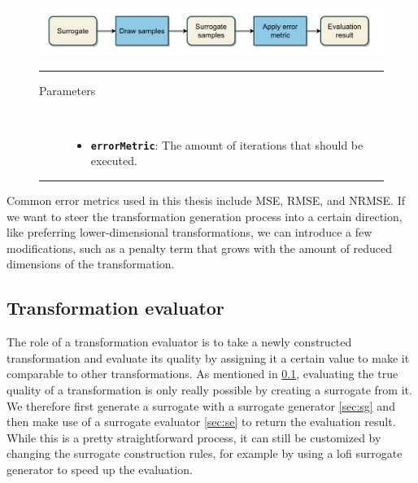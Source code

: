 \documentclass[
  a4paper,  %
  twoside,  %
  bibliography=totoc,
  headsepline,
  cleardoublepage=empty,
  parskip=half,
  draft=false
]{scrbook}
\newcommand{\delimit}{{\color{silver}\noindent\rule{\textwidth}{1pt}}}
\begin{document}
\begin{mdframed}[style=style,frametitle={Surrogate evaluator}]
\begin{figure}[H]
\includegraphics[width=\textwidth]{graphics/SurrogateEval.pdf}
\vspace{-4.5mm}

\delimit

\begin{description}
\item[Parameters] {~ \begin{itemize}[\indent{}]
\item \texttt{\textbf{errorMetric}}: The amount of iterations that should be executed.
\end{itemize}}
\end{description}

\delimit

\label{fig:se}
\end{figure}
\end{mdframed}

Common error metrics used in this thesis include MSE, RMSE, and NRMSE.
If we want to steer the transformation generation process into a certain direction, like preferring lower-dimensional transformations, we can introduce a few modifications, such as a penalty term that grows with the amount of reduced dimensions of the transformation.

\subsection {Transformation evaluator}
\label{sec:te}

The role of a transformation evaluator is to take a newly constructed transformation and evaluate its quality by assigning it a certain value to make it comparable to other transformations.
As mentioned in \cref{sec:te}, evaluating the true quality of a transformation is only really possible by creating a surrogate from it.
We therefore first generate a surrogate with a surrogate generator \cref{sec:sg} and then make use of a surrogate evaluator \cref{sec:se} to return the evaluation result.
While this is a pretty straightforward process, it can still be customized by changing the surrogate construction rules, for example by using a lofi surrogate generator to speed up the evaluation.
\end{document}
